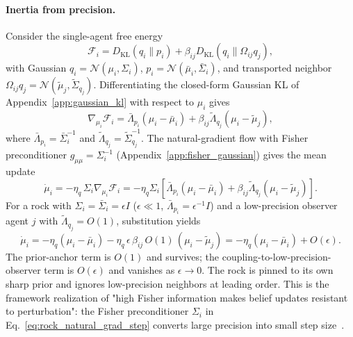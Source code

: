 \documentclass[11pt]{article}
\begin{document}
\paragraph{Inertia from precision.} Consider the single-agent free energy
\begin{equation}
\mathcal{F}_i = D_{\mathrm{KL}}(q_i \| p_i) + \beta_{ij} D_{\mathrm{KL}}(q_i \| \Omega_{ij} q_j),
\end{equation}
with Gaussian $q_i = \mathcal{N}(\mu_i, \Sigma_i)$, $p_i = \mathcal{N}(\bar{\mu}_i, \bar{\Sigma}_i)$, and transported neighbor $\Omega_{ij} q_j = \mathcal{N}(\tilde{\mu}_j, \tilde{\Sigma}_{q_j})$. Differentiating the closed-form Gaussian KL of Appendix~\ref{app:gaussian_kl} with respect to $\mu_i$ gives
\begin{equation}
\nabla_{\mu_i}\mathcal{F}_i = \bar{\Lambda}_{p_i}(\mu_i - \bar{\mu}_i) + \beta_{ij}\tilde{\Lambda}_{q_j}(\mu_i - \tilde{\mu}_j),
\label{eq:rock_grad_mu}
\end{equation}
where $\bar{\Lambda}_{p_i} = \bar{\Sigma}_i^{-1}$ and $\tilde{\Lambda}_{q_j} = \tilde{\Sigma}_{q_j}^{-1}$. The natural-gradient flow with Fisher preconditioner $g_{\mu\mu} = \Sigma_i^{-1}$ (Appendix~\ref{app:fisher_gaussian}) gives the mean update
\begin{equation}
\dot{\mu}_i = -\eta_q\,\Sigma_i \nabla_{\mu_i}\mathcal{F}_i = -\eta_q\Sigma_i\left[\bar{\Lambda}_{p_i}(\mu_i - \bar{\mu}_i) + \beta_{ij}\tilde{\Lambda}_{q_j}(\mu_i - \tilde{\mu}_j)\right].
\label{eq:rock_natural_grad_step}
\end{equation}
For a rock with $\Sigma_i = \bar{\Sigma}_i = \epsilon I$ ($\epsilon \ll 1$, $\bar{\Lambda}_{p_i} = \epsilon^{-1} I$) and a low-precision observer agent $j$ with $\tilde{\Lambda}_{q_j} = O(1)$, substitution yields
\begin{equation}
\dot{\mu}_i = -\eta_q(\mu_i - \bar{\mu}_i) - \eta_q\,\epsilon\,\beta_{ij}\,O(1)\,(\mu_i - \tilde{\mu}_j) = -\eta_q(\mu_i - \bar{\mu}_i) + O(\epsilon).
\label{eq:rock_inertia}
\end{equation}
The prior-anchor term is $O(1)$ and survives; the coupling-to-low-precision-observer term is $O(\epsilon)$ and vanishes as $\epsilon \to 0$. The rock is pinned to its own sharp prior and ignores low-precision neighbors at leading order. This is the framework realization of "high Fisher information makes belief updates resistant to perturbation": the Fisher preconditioner $\Sigma_i$ in Eq.~\eqref{eq:rock_natural_grad_step} converts large precision into small step size~\cite{Amari2016}.
\end{document}
